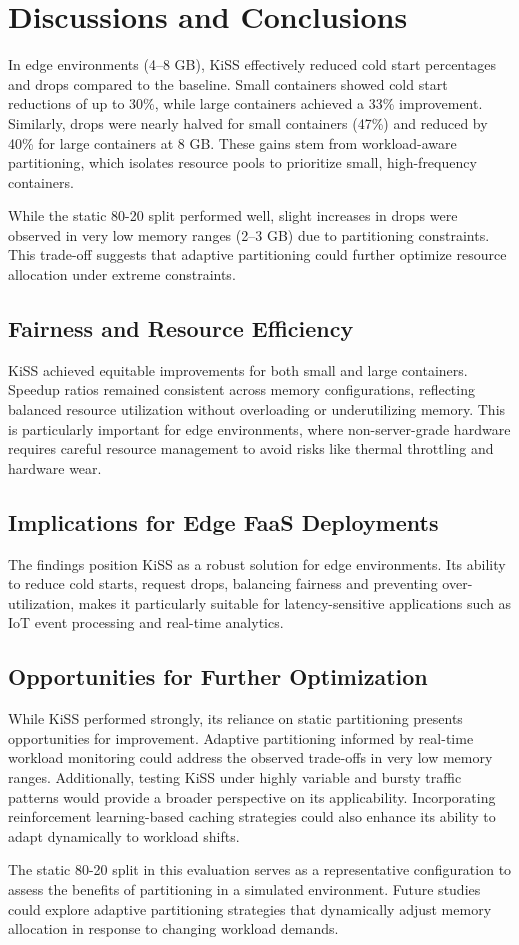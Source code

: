 \section{Discussions and Conclusions}\label{sec:discuss}
In edge environments (4--8 GB), KiSS effectively reduced cold start percentages and drops compared to the baseline. Small containers showed cold start reductions of up to 30\%, while large containers achieved a 33\% improvement. Similarly, drops were nearly halved for small containers (47\%) and reduced by 40\% for large containers at 8 GB. These gains stem from workload-aware partitioning, which isolates resource pools to prioritize small, high-frequency containers.

While the static 80-20 split performed well, slight increases in drops were observed in very low memory ranges (2--3 GB) due to partitioning constraints. This trade-off suggests that adaptive partitioning could further optimize resource allocation under extreme constraints.

\subsection{Fairness and Resource Efficiency}

KiSS achieved equitable improvements for both small and large containers. Speedup ratios remained consistent across memory configurations, reflecting balanced resource utilization without overloading or underutilizing memory. This is particularly important for edge environments, where non-server-grade hardware requires careful resource management to avoid risks like thermal throttling and hardware wear.

\subsection{Implications for Edge FaaS Deployments}

The findings position KiSS as a robust solution for edge environments. Its ability to reduce cold starts, request drops, balancing fairness and preventing over-utilization, makes it particularly suitable for latency-sensitive applications such as IoT event processing and real-time analytics. 


\subsection{Opportunities for Further Optimization}

While KiSS performed strongly, its reliance on static partitioning presents opportunities for improvement. Adaptive partitioning informed by real-time workload monitoring could address the observed trade-offs in very low memory ranges. Additionally, testing KiSS under highly variable and bursty traffic patterns would provide a broader perspective on its applicability. Incorporating reinforcement learning-based caching strategies could also enhance its ability to adapt dynamically to workload shifts.

The static 80-20 split in this evaluation serves as a representative configuration to assess the benefits of partitioning in a simulated environment. Future studies could explore adaptive partitioning strategies that dynamically adjust memory allocation in response to changing workload demands.
